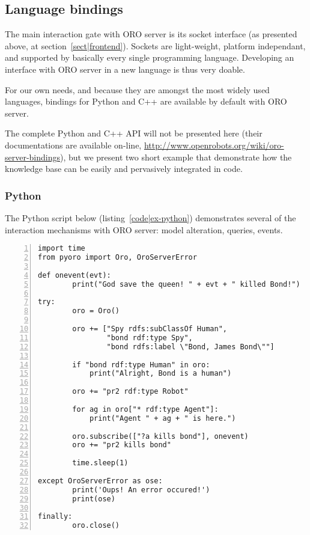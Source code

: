 \subsection{Language bindings}
\label{sect|bindings}

The main interaction gate with ORO server is its socket interface (as presented
above, at section~\ref{sect|frontend}). Sockets are light-weight, platform
independant, and supported by basically every single programming language.
Developing an interface with ORO server in a new language is thus very doable.

For our own needs, and because they are amongst the most widely used languages,
bindings for Python and C++ are available by default with ORO server.

The complete Python and C++ API will not be presented here (their
documentations are available on-line,
\url{http://www.openrobots.org/wiki/oro-server-bindings}), but we present two
short example that demonstrate how the knowledge base can be easily and
pervasively integrated in code.

\subsubsection{Python}

The Python script below (listing~\ref{code|ex-python}) demonstrates several of
the interaction mechanisms with ORO server: model alteration, queries, events.

\lstset{language=python}
\begin{lstlisting}[numbers=left,caption=Example of interaction with {\tt oro-server} in Python, label = code|ex-python]
import time
from pyoro import Oro, OroServerError

def onevent(evt):
        print("God save the queen! " + evt + " killed Bond!")

try:
        oro = Oro()

        oro += ["Spy rdfs:subClassOf Human", 
                "bond rdf:type Spy", 
                "bond rdfs:label \"Bond, James Bond\""]

        if "bond rdf:type Human" in oro:
            print("Alright, Bond is a human")

        oro += "pr2 rdf:type Robot"

        for ag in oro["* rdf:type Agent"]:
            print("Agent " + ag + " is here.")

        oro.subscribe(["?a kills bond"], onevent)
        oro += "pr2 kills bond"

        time.sleep(1)

except OroServerError as ose:
        print('Oups! An error occured!')
        print(ose)

finally:
        oro.close()
\end{lstlisting}

